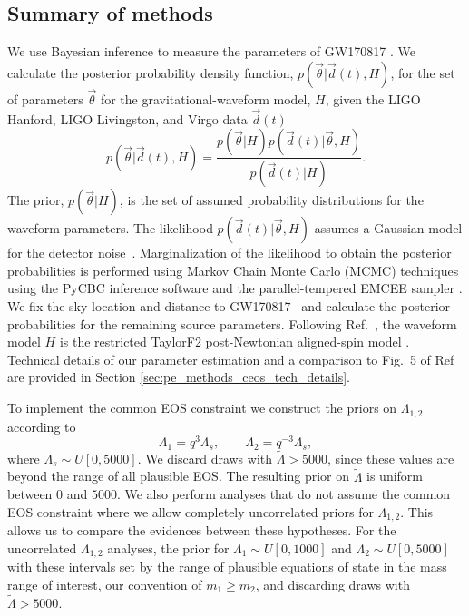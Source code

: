 \subsection{Summary of methods}\label{sec:pe_methods_ceos_summ}
We use Bayesian inference to measure the parameters of GW170817 \cite{Christensen:2001cr}. We calculate the posterior probability density function, $p(\vec{\theta}|\vec{d}(t),H)$, for the set of parameters $\vec{\theta}$ for the gravitational-waveform model, $H$, given the LIGO Hanford, LIGO Livingston, and Virgo data $\vec{d}(t)$~\cite{Vallisneri:2014vxa,gw170817-losc}
\begin{equation}
p(\vec{\theta}|\vec{d}(t),H) = \frac{p(\vec{\theta}|H) p(\vec{d}(t)|\vec{\theta},H)}{p(\vec{d}(t)|H)}.
\label{eq:postpdf}
\end{equation}
The prior, $p(\vec{\theta}|H)$, is the set of assumed probability distributions for the waveform parameters. The likelihood $p(\vec{d}(t)|\vec{\theta},H)$ assumes a Gaussian model for the detector noise~\cite{Rover:2006bb}. Marginalization of the likelihood to obtain the posterior probabilities is performed using Markov Chain Monte Carlo (MCMC) techniques using the PyCBC inference software \cite{Biwer:2018osg,alex_nitz_2018_1208115} and the parallel-tempered EMCEE sampler \cite{emcee,vousden:2016,mcmc}. We fix the sky location and distance to GW170817~\cite{Soares-Santos:2017lru,Cantiello:2018ffy} and calculate the posterior probabilities for the remaining source parameters. Following Ref.~\cite{TheLIGOScientific:2017qsa}, the waveform model $H$ is the restricted TaylorF2 post-Newtonian aligned-spin model \cite{Sathyaprakash:1991mt,Buonanno:2009zt,Arun:2008kb,Mikoczi:2005dn,Bohe:2013cla,Vines:2011ud}.
Technical details of our parameter estimation and a comparison to Fig.~5 of Ref~\cite{TheLIGOScientific:2017qsa} are provided in Section \ref{sec:pe_methods_ceos_tech_details}.%

To implement the common EOS constraint we construct the priors on $\Lambda_{1,2}$ according to
\begin{equation}
\Lambda_1=q^3\Lambda_s,\qquad\Lambda_2=q^{-3}\Lambda_s,
\label{eq:lambdas}\end{equation}
where $\Lambda_s \sim U[0,5000]$. We discard draws with 
$\tilde{\Lambda} > 5000$, since these values are beyond the range of all plausible EOS. The resulting prior on $\tilde\Lambda$ is uniform between $0$ and $5000$.  We also perform analyses that do not assume the common EOS constraint where we allow completely uncorrelated priors for $\Lambda_{1,2}$. This allows us to compare the evidences between these hypotheses. For the uncorrelated $\Lambda_{1,2}$ analyses, the prior for $\Lambda_1 \sim U[0,1000]$ and $\Lambda_2 \sim U[0,5000]$ with these intervals set by the range of plausible equations of state in the mass range of interest, our convention of $m_1 \geq m_2$, and discarding draws with $\tilde\Lambda > 5000$.

